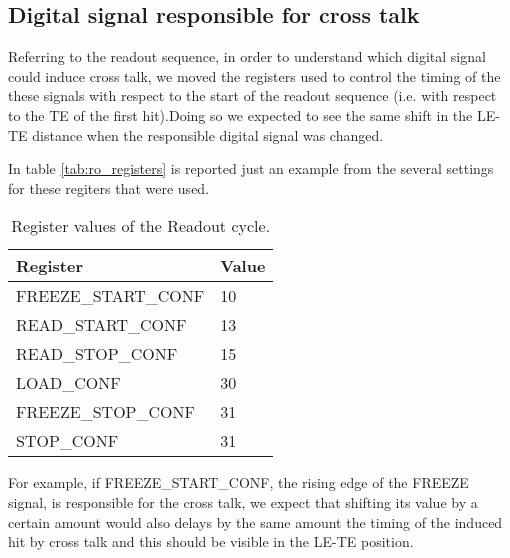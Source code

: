 \subsection{Digital signal responsible for cross talk }

Referring to the readout sequence, in order to understand which digital signal could induce cross talk, we moved the registers used to control the timing of the these signals with respect to the start of the readout sequence (i.e. with respect to the TE of the first hit).Doing so we expected to see the same shift in the LE-TE distance  when the responsible digital signal was changed.

In table \autoref{tab:ro_registers} is reported just an example from the several settings for these regiters that were used.


\begin{table}[h!]
\centering
\begin{tabular}{>{} C{5cm}|C{1.7cm}}
Register & Value \\
\hline
\textsc{FREEZE\_START\_CONF} & 10\\[0.3ex]
\hline
\textsc{READ\_START\_CONF}& 13 \\[0.3ex]
\hline
\textsc{READ\_STOP\_CONF} & 15 \\[0.3ex]
\hline
\textsc{LOAD\_CONF} & 30 \\[0.3ex]
\hline
\textsc{FREEZE\_STOP\_CONF} & 31\\[0.3ex]
\hline
\textsc{STOP\_CONF} & 31\\[0.3ex]
\hline
\end{tabular}
\caption{Register values of the Readout cycle.}
\label{tab:ro_registers}
\end{table}

For example, if \textsc{FREEZE\_START\_CONF}, the rising edge of the FREEZE signal, is responsible for the cross talk, we expect that shifting its value by a certain amount would also delays by the same amount the timing of the induced hit by cross talk  and this should be visible in the LE-TE position. \\


